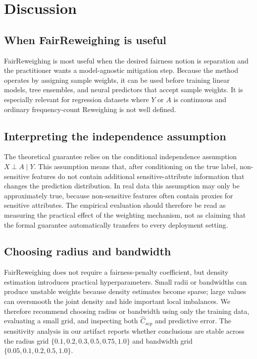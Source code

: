 \section{Discussion}
\label{sect:Discussion}

\subsection{When FairReweighing is useful}
FairReweighing is most useful when the desired fairness notion is separation and the practitioner wants a model-agnostic mitigation step. Because the method operates by assigning sample weights, it can be used before training linear models, tree ensembles, and neural predictors that accept sample weights. It is especially relevant for regression datasets where $Y$ or $A$ is continuous and ordinary frequency-count Reweighing is not well defined.

\subsection{Interpreting the independence assumption}
The theoretical guarantee relies on the conditional independence assumption $X\perp A\mid Y$. This assumption means that, after conditioning on the true label, non-sensitive features do not contain additional sensitive-attribute information that changes the prediction distribution. In real data this assumption may only be approximately true, because non-sensitive features often contain proxies for sensitive attributes. The empirical evaluation should therefore be read as measuring the practical effect of the weighting mechanism, not as claiming that the formal guarantee automatically transfers to every deployment setting.

\subsection{Choosing radius and bandwidth}
FairReweighing does not require a fairness-penalty coefficient, but density estimation introduces practical hyperparameters. Small radii or bandwidths can produce unstable weights because density estimates become sparse; large values can oversmooth the joint density and hide important local imbalances. We therefore recommend choosing radius or bandwidth using only the training data, evaluating a small grid, and inspecting both $\hat{C}_{sep}$ and predictive error. The sensitivity analysis in our artifact reports whether conclusions are stable across the radius grid $\{0.1,0.2,0.3,0.5,0.75,1.0\}$ and bandwidth grid $\{0.05,0.1,0.2,0.5,1.0\}$.

